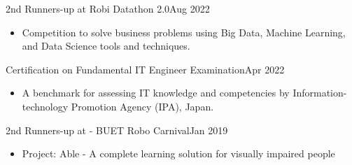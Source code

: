 
  \customSubHeadingContentStart
  
    \customSubHeading
      {2nd Runners-up at Robi Datathon 2.0}{Aug 2022}
      \begin{itemize}[itemsep=-3pt, left=0pt]
        \item {Competition to solve business problems using Big Data, Machine Learning, and Data Science tools and techniques.}
    \end{itemize}
    \vspace{-10pt}
      
      
    \customSubHeading
      {Certification on Fundamental IT Engineer Examination}{Apr 2022}
     \begin{itemize}[itemsep=-3pt, left=0pt]
        \item{ A benchmark for assessing IT knowledge and competencies by Information-technology Promotion Agency (IPA), Japan.}
    \end{itemize}
    \vspace{-10pt}

    \customSubHeading
      {2nd Runners-up at - BUET Robo Carnival}{Jan 2019}
    \begin{itemize}[itemsep=-3pt, left=0pt]
        \item{Project: Able - A complete learning solution for visually impaired people }
    \end{itemize}
    \vspace{-10pt}



  \customSubHeadingContentEnd
\vspace{-6pt}